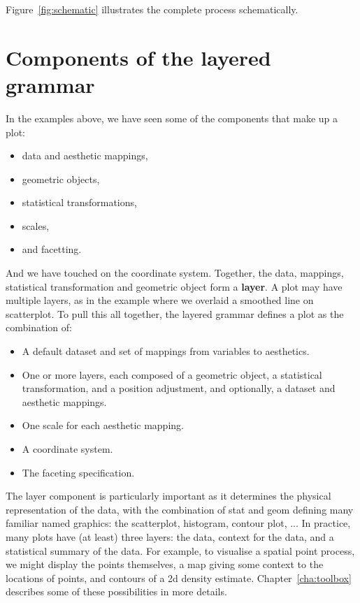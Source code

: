 Figure~\ref{fig:schematic} illustrates the complete process schematically.

\section{Components of the layered grammar}
\label{sec:components}

In the examples above, we have seen some of the components that make up a plot:

\begin{itemize}
  \item data and aesthetic mappings,
  \item geometric objects, 
  \item statistical transformations,
  \item scales,
  \item and facetting.
\end{itemize}

\noindent And we have touched on the coordinate system.  Together, the data, mappings, statistical transformation and geometric object form a {\bf layer}.  A plot may have multiple layers, as in the example where we overlaid a  smoothed line on scatterplot.  To pull this all together, the layered grammar defines a plot as the combination of:

\begin{itemize}
  \item A default dataset and set of mappings from variables to aesthetics.
  \item One or more layers, each composed of a geometric object, a statistical transformation, and a position adjustment, and optionally, a dataset and aesthetic mappings.
  \item One scale for each aesthetic mapping.
  \item A coordinate system.
  \item The faceting specification.
\end{itemize}

The layer component is particularly important as it determines the physical representation of the data, with the combination of stat and geom defining many familiar named graphics: the scatterplot, histogram, contour plot, ...  In practice, many plots have (at least) three layers: the data, context for the data, and a statistical summary of the data.  For example, to visualise a  spatial point process, we might display the points themselves, a map giving some context to the locations of points, and contours of a 2d density estimate.  Chapter~\ref{cha:toolbox} describes some of these possibilities in more details.

